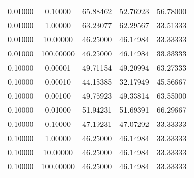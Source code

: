 \begin{tabular}{ccccc}
0.01000 &    0.10000 &           65.88462 &       52.76923 &           56.78000 \\
0.01000 &    1.00000 &           63.23077 &       62.29567 &           33.51333 \\
0.01000 &   10.00000 &           46.25000 &       46.14984 &           33.33333 \\
0.01000 &  100.00000 &           46.25000 &       46.14984 &           33.33333 \\
0.10000 &    0.00001 &           49.71154 &       49.20994 &           63.27333 \\
0.10000 &    0.00010 &           44.15385 &       32.17949 &           45.56667 \\
0.10000 &    0.00100 &           49.76923 &       49.33814 &           63.55000 \\
0.10000 &    0.01000 &           51.94231 &       51.69391 &           66.29667 \\
0.10000 &    0.10000 &           47.19231 &       47.07292 &           33.33333 \\
0.10000 &    1.00000 &           46.25000 &       46.14984 &           33.33333 \\
0.10000 &   10.00000 &           46.25000 &       46.14984 &           33.33333 \\
0.10000 &  100.00000 &           46.25000 &       46.14984 &           33.33333 \\
\hline \hline
\end{tabular}
